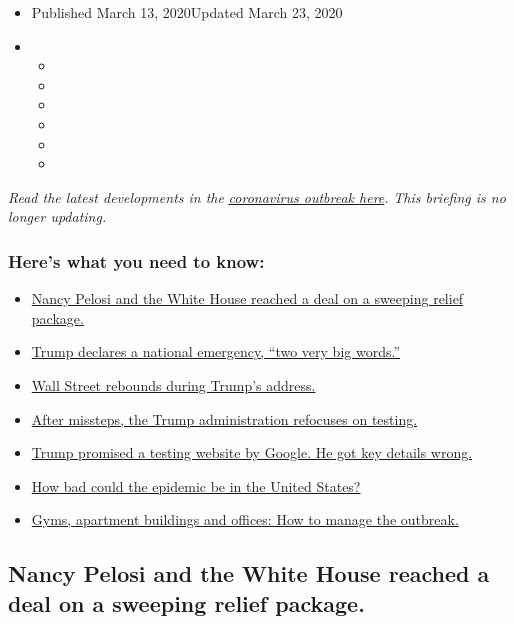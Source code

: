 \begin{itemize}
\item
  Published March 13, 2020Updated March 23, 2020
\item
  \begin{itemize}
  \item
  \item
  \item
  \item
  \item
  \item
  \end{itemize}
\end{itemize}

\emph{Read the latest developments in the}
\href{https://www.nytimes3xbfgragh.onion/2020/03/23/world/coronavirus-news.html}{\emph{coronavirus
outbreak here}}\emph{.} \emph{This briefing is no longer updating.}

\hypertarget{heres-what-you-need-to-know}{%
\subsubsection{Here's what you need to
know:}\label{heres-what-you-need-to-know}}

\begin{itemize}
\tightlist
\item
  \protect\hyperlink{link-47cd8806}{Nancy Pelosi and the White House
  reached a deal on a sweeping relief package.}
\item
  \protect\hyperlink{link-37509802}{Trump declares a national emergency,
  ``two very big words.''}
\item
  \protect\hyperlink{link-3359d40e}{Wall Street rebounds during Trump's
  address.}
\item
  \protect\hyperlink{link-1a92c290}{After missteps, the Trump
  administration refocuses on testing.}
\item
  \protect\hyperlink{link-50441278}{Trump promised a testing website by
  Google. He got key details wrong.}
\item
  \protect\hyperlink{link-62cf8d19}{How bad could the epidemic be in the
  United States?}
\item
  \protect\hyperlink{link-45290ade}{Gyms, apartment buildings and
  offices: How to manage the outbreak.}
\end{itemize}

\hypertarget{nancy-pelosi-and-the-white-house-reached-a-deal-on-a-sweeping-relief-package}{%
\subsection{Nancy Pelosi and the White House reached a deal on a
sweeping relief
package.}\label{nancy-pelosi-and-the-white-house-reached-a-deal-on-a-sweeping-relief-package}}

